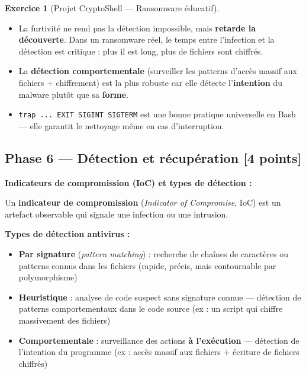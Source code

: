 \documentclass[a4paper,11pt]{article}
\theoremstyle{plain}
\theoremstyle{definition}
\newtheorem{exercice}{Exercice}
\begin{document}
\begin{exercice}[Projet CryptoShell --- Ransomware éducatif]
\begin{correction}
\begin{pointcle}
\begin{itemize}
    \item La furtivité ne rend pas la détection impossible, mais \textbf{retarde la découverte}. Dans un ransomware réel, le temps entre l'infection et la détection est critique : plus il est long, plus de fichiers sont chiffrés.
    \item La \textbf{détection comportementale} (surveiller les patterns d'accès massif aux fichiers + chiffrement) est la plus robuste car elle détecte l'\textbf{intention} du malware plutôt que sa \textbf{forme}.
    \item \texttt{trap ... EXIT SIGINT SIGTERM} est une bonne pratique universelle en Bash --- elle garantit le nettoyage même en cas d'interruption.
\end{itemize}
\end{pointcle}

\end{correction}



\subsection*{Phase 6 --- Détection et récupération \hfill \normalsize [4 points]}

\begin{rappel}
\textbf{Indicateurs de compromission (IoC) et types de détection :}

Un \textbf{indicateur de compromission} (\textit{Indicator of Compromise}, IoC) est un artefact observable qui signale une infection ou une intrusion.

\medskip
\textbf{Types de détection antivirus :}
\begin{itemize}
    \item \textbf{Par signature} (\textit{pattern matching}) : recherche de chaînes de caractères ou patterns connus dans les fichiers (rapide, précis, mais contournable par polymorphisme)
    \item \textbf{Heuristique} : analyse de code suspect sans signature connue --- détection de patterns comportementaux dans le code source (ex : un script qui chiffre massivement des fichiers)
    \item \textbf{Comportementale} : surveillance des actions \textbf{à l'exécution} --- détection de l'intention du programme (ex : accès massif aux fichiers + écriture de fichiers chiffrés)
\end{itemize}


\end{rappel}
\end{exercice}
\end{document}
